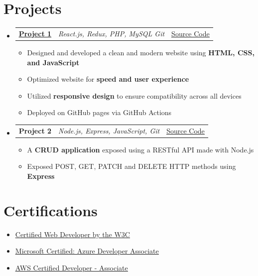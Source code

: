 \documentclass[a4paper,11pt]{article}
\makeatletter
\newcommand{\resumeItem}[1]{
  \item\small{#1}
}
\newcommand{\resumeItemListStart}{\begin{itemize}[rightmargin=0.11in]}
\newcommand{\resumeItemListEnd}{\end{itemize}}
\newcommand{\resumeTrioHeading}[3]{
  \item\small{
    \begin{tabular*}{0.96\textwidth}[t]{
      l@{\extracolsep{\fill}}c@{\extracolsep{\fill}}r
    }
      \textbf{#1} & \textit{#2} & #3
    \end{tabular*}
  }
}
\newcommand{\resumeHeadingListStart}{
  \begin{itemize}[leftmargin=0.15in, label={}]
}
\newcommand{\resumeHeadingListEnd}{\end{itemize}}
\makeatother
\begin{document}
\section{Projects}
  \resumeHeadingListStart{}
    \resumeTrioHeading{\href{https://project1.com}{\uline{Project 1}}}{React.js, Redux, PHP, MySQL Git}{\href{https://proect1.com/source-code/}{\uline{Source Code}}}
      \resumeItemListStart{}
        \resumeItem{Designed and developed a clean and modern website using \textbf{HTML, CSS, and JavaScript}}
        \resumeItem{Optimized website for \textbf{speed and user experience}}
        \resumeItem{Utilized \textbf{responsive design} to ensure compatibility across all devices}
        \resumeItem{Deployed on GitHub pages via GitHub Actions}
      \resumeItemListEnd{}

      \resumeTrioHeading{Project 2}{Node.js, Express, JavaScript, Git}{\href{https:project2.com/source-code}{\uline{Source Code}}}
      \resumeItemListStart{}
        \resumeItem{A \textbf{CRUD application} exposed using a RESTful API made with Node.js}
        \resumeItem{Exposed POST, GET, PATCH and DELETE HTTP methods using \textbf{Express}}
      \resumeItemListEnd{}
  \resumeHeadingListEnd{}



\section{Certifications}
  \resumeItemListStart{}
    \resumeItem{\href{https://dummy-certification.com}{\uline{Certified Web Developer by the W3C}}}
    \resumeItem{\href{https://dummy-certification.com}{\uline{Microsoft Certified: Azure Developer Associate}}}
    \resumeItem{\href{https://dummy-certification.com}{\uline{AWS Certified Developer - Associate}}}
  \resumeItemListEnd{}
\end{document}
